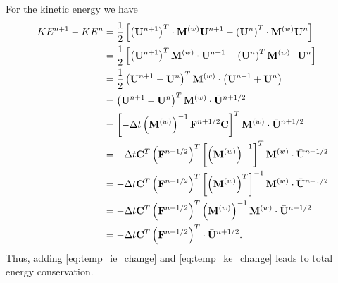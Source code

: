 \documentclass[11pt]{report}
\begin{document}
For the kinetic energy we have
\begin{align}
    \label{eq:temp_ke_change}
    KE^{n+1} - KE^n &= \frac{1}{2} \left[ \left( \mathbf{U}^{n+1} \right)^T \cdot \mathbf{M}^{(w)} \mathbf{U}^{n+1} - \left( \mathbf{U}^n \right)^T \cdot \mathbf{M}^{(w)} \mathbf{U}^n \right] \nonumber \\
    &= \frac{1}{2} \left[ \left( \mathbf{U}^{n+1} \right)^T \mathbf{M}^{(w)} \cdot \mathbf{U}^{n+1} - \left( \mathbf{U}^n \right)^T \mathbf{M}^{(w)} \cdot \mathbf{U}^n \right] \nonumber \\
    &= \frac{1}{2} \left( \mathbf{U}^{n+1} - \mathbf{U}^n \right)^T \mathbf{M}^{(w)} \cdot \left( \mathbf{U}^{n+1} + \mathbf{U}^n \right) \nonumber \\ 
    &= \left( \mathbf{U}^{n+1} - \mathbf{U}^n \right)^T \mathbf{M}^{(w)} \cdot \bar{\mathbf{U}}^{n+1/2} \nonumber \\
    &= \left[ - \Delta t \left( \mathbf{M}^{(w)} \right)^{-1} \mathbf{F}^{n+1/2} \mathbf{C} \right]^T \mathbf{M}^{(w)} \cdot \bar{\mathbf{U}}^{n+1/2} \nonumber \\
    &= -\Delta t \mathbf{C}^T \left( \mathbf{F}^{n+1/2} \right)^T \left[ \left( \mathbf{M}^{(w)} \right)^{-1} \right]^T \mathbf{M}^{(w)} \cdot \bar{\mathbf{U}}^{n+1/2} \nonumber \\
    &= -\Delta t \mathbf{C}^T \left( \mathbf{F}^{n+1/2} \right)^T \left[ \left( \mathbf{M}^{(w)} \right)^T \right]^{-1} \mathbf{M}^{(w)} \cdot \bar{\mathbf{U}}^{n+1/2} \nonumber \\
    &= -\Delta t \mathbf{C}^T \left( \mathbf{F}^{n+1/2} \right)^T \left( \mathbf{M}^{(w)} \right)^{-1} \mathbf{M}^{(w)} \cdot \bar{\mathbf{U}}^{n+1/2} \nonumber \\
    &= -\Delta t \mathbf{C}^T \left( \mathbf{F}^{n+1/2} \right)^T \cdot \bar{\mathbf{U}}^{n+1/2}.
\end{align}
Thus, adding \cref{eq:temp_ie_change} and \cref{eq:temp_ke_change} leads to total energy conservation.

\end{document}
